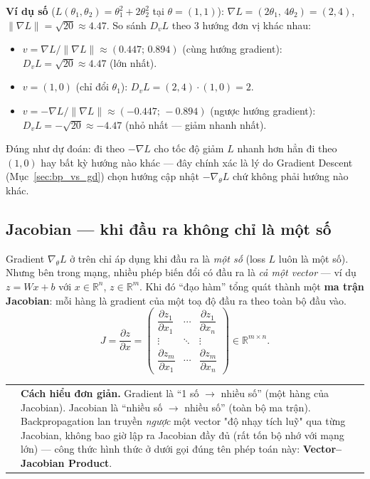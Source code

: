 \documentclass[12pt,a4paper]{article}
\makeatletter
\newenvironment{tructiep}[1][Cách hiểu đơn giản]
  {\par\smallskip\noindent\begin{tabular}{@{}p{0.35em}@{\hspace{6pt}}p{\dimexpr\linewidth-1.9em\relax}@{}}
   \textcolor{boxln}{\rule{2pt}{\baselineskip}} & \textbf{#1.}\enspace\ignorespaces}
  {\end{tabular}\par\smallskip}
\makeatother
\begin{document}
\textbf{Ví dụ số} ($L(\theta_1,\theta_2)=\theta_1^2+2\theta_2^2$ tại
$\theta=(1,1)$): $\nabla L = (2\theta_1,\,4\theta_2) = (2,4)$,
$\lVert\nabla L\rVert=\sqrt{20}\approx4.47$. So sánh $D_vL$ theo 3 hướng
đơn vị khác nhau:
\begin{itemize}
\item $v=\nabla L/\lVert\nabla L\rVert\approx(0.447;\,0.894)$ (cùng hướng gradient): $D_vL=\sqrt{20}\approx4.47$ (lớn nhất).
\item $v=(1,0)$ (chỉ đổi $\theta_1$): $D_vL = (2,4)\cdot(1,0)=2$.
\item $v=-\nabla L/\lVert\nabla L\rVert\approx(-0.447;\,-0.894)$ (ngược hướng gradient): $D_vL=-\sqrt{20}\approx-4.47$ (nhỏ nhất --- giảm nhanh nhất).
\end{itemize}
Đúng như dự đoán: đi theo $-\nabla L$ cho tốc độ giảm $L$ nhanh hơn hẳn đi
theo $(1,0)$ hay bất kỳ hướng nào khác --- đây chính xác là lý do
Gradient Descent (Mục~\ref{sec:bp_vs_gd}) chọn hướng cập nhật
$-\nabla_\theta L$ chứ không phải hướng nào khác.

\subsection{Jacobian --- khi đầu ra không chỉ là một số}
\label{sec:jacobian}

Gradient $\nabla_\theta L$ ở trên chỉ áp dụng khi đầu ra là \emph{một số}
(loss $L$ luôn là một số). Nhưng bên trong mạng, nhiều phép biến đổi có
đầu ra là \emph{cả một vector} --- ví dụ $z=Wx+b$ với $x\in\mathbb R^n$,
$z\in\mathbb R^m$. Khi đó ``đạo hàm'' tổng quát thành một \textbf{ma trận
Jacobian}: mỗi hàng là gradient của một toạ độ đầu ra theo toàn bộ đầu vào.
$$J = \frac{\partial z}{\partial x} = \begin{pmatrix}
\dfrac{\partial z_1}{\partial x_1} & \cdots & \dfrac{\partial z_1}{\partial x_n} \\[4pt]
\vdots & \ddots & \vdots \\[2pt]
\dfrac{\partial z_m}{\partial x_1} & \cdots & \dfrac{\partial z_m}{\partial x_n}
\end{pmatrix} \in \mathbb R^{m\times n}.$$

\begin{tructiep}
Gradient là ``1 số $\to$ nhiều số'' (một hàng của Jacobian). Jacobian là
``nhiều số $\to$ nhiều số'' (toàn bộ ma trận). Backpropagation lan truyền
\emph{ngược} một vector "độ nhạy tích luỹ" qua từng Jacobian, không bao giờ
lập ra Jacobian đầy đủ (rất tốn bộ nhớ với mạng lớn) --- công thức hình
thức ở dưới gọi đúng tên phép toán này: \textbf{Vector--Jacobian Product}.
\end{tructiep}
\end{document}
